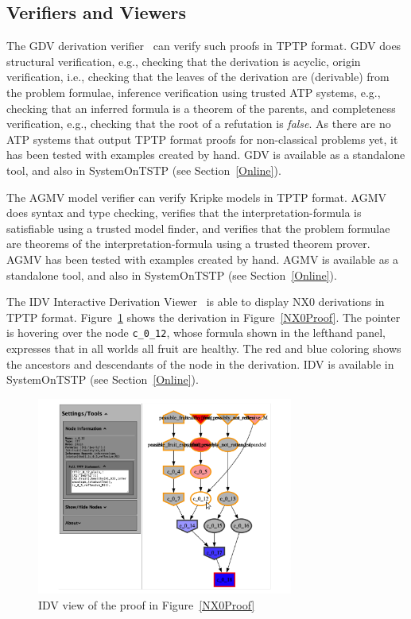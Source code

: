 \documentclass{ceurart}
\begin{document}
\subsection{Verifiers and Viewers}
\label{Verifiers}

The GDV derivation verifier~\cite{Sut06} can verify such proofs in TPTP format.
GDV does structural verification, e.g., checking that the derivation is acyclic, origin 
verification, i.e., checking that the leaves of the derivation are (derivable) from the problem 
formulae, inference verification using trusted ATP systems, e.g., checking that an inferred 
formula is a theorem of the parents, and completeness verification, e.g., checking that the root 
of a refutation is {\em false}.
As there are no ATP systems that output TPTP format proofs for non-classical problems yet, 
it has been tested with examples created by hand.
GDV is available as a standalone tool, and also in SystemOnTSTP (see Section~\ref{Online}).

The AGMV model verifier \cite{SS+23-LPAR} can verify Kripke models in TPTP format.
AGMV does syntax and type checking, verifies that the interpretation-formula is satisfiable
using a trusted model finder, and verifies that the problem formulae are theorems of the
interpretation-formula using a trusted theorem prover.
AGMV has been tested with examples created by hand.
AGMV is available as a standalone tool, and also in SystemOnTSTP (see Section~\ref{Online}).

The IDV Interactive Derivation Viewer~\cite{TPS07} is able to display NX0 derivations in TPTP 
format.
Figure~\ref{NX0ProofIDV} shows the derivation in Figure~\ref{NX0Proof}.
The pointer is hovering over the node {\tt c\_0\_12}, whose formula shown in the lefthand panel,
expresses that in all worlds all fruit are healthy.
The red and blue coloring shows the ancestors and descendants of the node in the derivation.
IDV is available in SystemOnTSTP (see Section~\ref{Online}).

\begin{figure}[htbp]
\centering
\includegraphics[width=0.75\textwidth]{NX0ProofIDV.pdf}
\caption{IDV view of the proof in Figure~\ref{NX0Proof}}
\label{NX0ProofIDV}
\end{figure}
\end{document}
